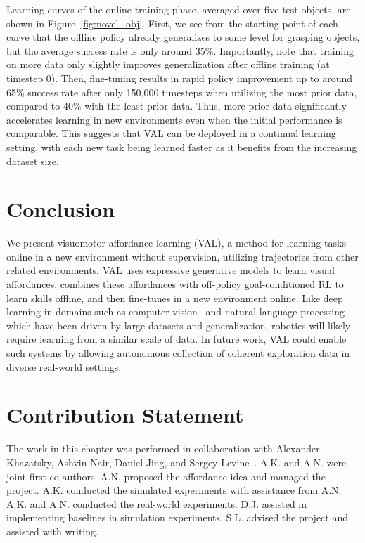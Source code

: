 Learning curves of the online training phase, averaged over five test objects, are shown in Figure~\ref{fig:novel_obj}. 
First, we see from the starting point of each curve that the offline policy already generalizes to some level for grasping objects, but the average success rate is only around 35\%. 
Importantly, note that training on more data only slightly improves generalization after offline training (at timestep 0).
Then, fine-tuning results in rapid policy improvement up to around 65\% success rate after only 150,000 timesteps when utilizing the most prior data, compared to 40\% with the least prior data.
Thus, more prior data significantly accelerates learning in new environments even when the initial performance is comparable.
This suggests that VAL can be deployed in a continual learning setting, with each new task being learned faster as it benefits from the increasing dataset size.



\section{Conclusion}
\label{sec:conclusion}

We present visuomotor affordance learning (VAL), a method for learning tasks online in a new environment without supervision, utilizing trajectories from other related environments. VAL uses expressive generative models to learn visual affordances, combines these affordances with off-policy goal-conditioned RL to learn skills offline, and then fine-tunes in a new environment online. Like deep learning in domains such as computer vision~\citep{krizhevsky2012imagenet} and natural language processing~\citep{devlin2019bert} which have been driven by large datasets and generalization, robotics will likely require learning from a similar scale of data. In future work, VAL could enable such systems by allowing autonomous collection of coherent exploration data in diverse real-world settings.

\section{Contribution Statement}

The work in this chapter was performed in collaboration with Alexander Khazatsky, Ashvin Nair, Daniel Jing, and Sergey Levine~\citep{khazatsky2021val}. A.K. and A.N. were joint first co-authors. A.N. proposed the affordance idea and managed the project. A.K. conducted the simulated experiments with assistance from A.N. A.K. and A.N. conducted the real-world experiments. D.J. assisted in implementing baselines in simulation experiments. S.L. advised the project and assisted with writing.
